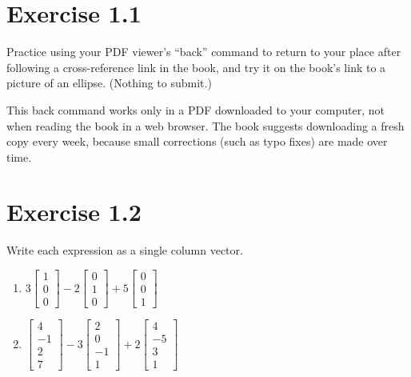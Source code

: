 \section*{Exercise 1.1}
\begin{exercise}
Practice using your PDF viewer's ``back'' command to return to your place after
following a cross-reference link in the book, and try it on the book's link to
a picture of an ellipse. (Nothing to submit.)

This back command works only in a PDF downloaded to your computer, not when
reading the book in a web browser. The book suggests downloading a fresh copy
every week, because small corrections (such as typo fixes) are made over time.
\end{exercise}

\section*{Exercise 1.2}
\begin{exercise}
Write each expression as a single column vector.
\begin{enumerate}
  \item $3\begin{bmatrix} 1 \\ 0 \\ 0 \end{bmatrix}
        - 2\begin{bmatrix} 0 \\ 1 \\ 0 \end{bmatrix}
        + 5\begin{bmatrix} 0 \\ 0 \\ 1 \end{bmatrix}$
  \item $\begin{bmatrix} 4 \\ -1 \\ 2 \\ 7 \end{bmatrix}
        - 3\begin{bmatrix} 2 \\ 0 \\ -1 \\ 1 \end{bmatrix}
        + 2\begin{bmatrix} 4 \\ -5 \\ 3 \\ 1 \end{bmatrix}$
\end{enumerate}
\end{exercise}


